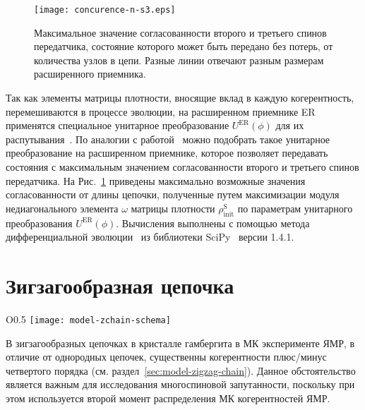 \begin{figure}[H]
    \centering
    \texttt{[image: concurence-n-s3.eps]}
    \caption{
      Максимальное значение согласованности второго и третьего спинов передатчика, состояние которого может быть передано без потерь,
      от количества узлов в цепи.
      Разные линии отвечают разным размерам расширенного приемника.
    }
    \label{fig:concurence-n-s3}
\end{figure}


Так как элементы матрицы плотности, вносящие вклад в каждую когерентность, перемешиваются в процессе эволюции,
на расширенном приемнике ER применятся специальное унитарное преобразование $U^\mathrm{ER}(\phi)$ для их распутывания~\cite{Feldman2017}.
По аналогии с работой~\cite{Bochkin2022} можно подобрать такое унитарное преобразование на расширенном приемнике,
которое позволяет передавать состояния с максимальным значением согласованности второго и третьего спинов передатчика.
На Рис.~\ref{fig:concurence-n-s3} приведены максимально возможные значения согласованности от длины цепочки,
полученные путем максимизации модуля недиагонального элемента $\omega$ матрицы плотности $\rho^\mathrm{S}_\mathrm{init}$ по параметрам унитарного преобразования $U^\mathrm{ER}(\phi)$.
Вычисления выполнены с помощью метода дифференциальной эволюции~\cite{Storn1997,Wormington1999,Lampinen2002} из библиотеки SciPy~\cite{SciPy} версии 1.4.1.

\newpage
\section{Зигзагообразная цепочка}

\begin{wrapfigure}{O}{0.5\textwidth}
    \centering
    \texttt{[image: model-zchain-schema]}
    \caption{\protect}
    \label{fig:model-zchain-schema}
\end{wrapfigure}

В зигзагообразных цепочках в кристалле гамбергита в МК эксперименте ЯМР,
в отличие от однородных цепочек,
существенны когерентности плюс/минус четвертого порядка (см. раздел~\ref{sec:model-zigzag-chain}).
Данное обстоятельство является важным для исследования многоспиновой запутанности,
поскольку при этом используется второй момент распределения МК когерентностей ЯМР.

